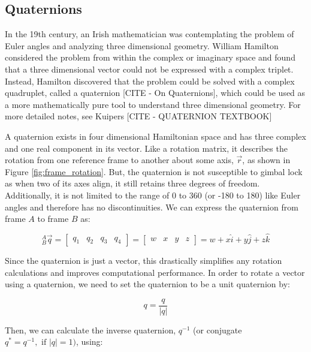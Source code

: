 \subsection{Quaternions} \label{ssec:quaternions}
In the 19th century, an Irish mathematician was contemplating the problem of Euler angles and analyzing three dimensional geometry.
William Hamilton considered the problem from within the complex or imaginary space and found that a three dimensional vector could not be expressed with a complex triplet.
Instead, Hamilton discovered that the problem could be solved with a complex quadruplet, called a quaternion [CITE - On Quaternions], which could be used as a more mathematically pure tool to understand three dimensional geometry.
For more detailed notes, see Kuipers [CITE - QUATERNION TEXTBOOK]

A quaternion exists in four dimensional Hamiltonian space and has three complex and one real component in its vector. 
Like a rotation matrix, it describes the rotation from one reference frame to another about some axis, $\vec{r}$, as shown in Figure \ref{fig:frame_rotation}.
But, the quaternion is not susceptible to gimbal lock as when two of its axes align, it still retains three degrees of freedom.
Additionally, it is not limited to the range of 0 to 360 (or -180 to 180) like Euler angles and therefore has no discontinuities.
We can express the quaternion from frame $A$ to frame $B$ as:

\begin{equation}
    {}^A_B \vec{q} = \left[
        \begin{matrix}
            q_1 & q_2 & q_3 & q_4
        \end{matrix}
    \right] = 
    \left[
        \begin{matrix}
            w & x & y & z
        \end{matrix}
    \right] = 
    w + x\hat{i} + y\hat{j} + z\hat{k}
\end{equation}

Since the quaternion is just a vector, this drastically simplifies any rotation calculations and improves computational performance.
In order to rotate a vector using a quaternion, we need to set the quaternion to be a unit quaternion by:

\begin{equation}
    q = \frac{q}{|q|}
\end{equation}

Then, we can calculate the inverse quaternion, ${q}^{-1}$ (or conjugate $q^*=q^{-1}, \text{ if } |q|=1)$, using:

